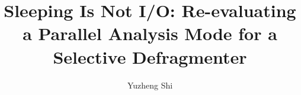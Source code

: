 \documentclass[sigconf,nonacm]{acmart}
\newif\ifblind \blindfalse
\begin{document}
\title{Sleeping Is Not I/O: Re-evaluating a Parallel Analysis Mode for a Selective
Defragmenter}

\ifblind
\author{Anonymous}
\affiliation{\institution{Anonymous institution}\country{}}
\else
\author{Yuzheng Shi}
\fi



\maketitle





\end{document}
